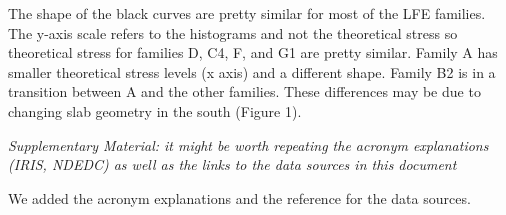 \documentclass[letterpaper, 12pt]{article}
\begin{document}
\bigskip


The shape of the black curves are pretty similar for most of the LFE families.  The y-axis scale refers to the histograms and not the theoretical stress so theoretical stress for families D, C4, F, and G1 are pretty similar.  Family A has smaller theoretical stress levels (x axis) and a different shape.  Family B2 is in a transition between A and the other families. These differences may be due to changing slab geometry in the south (Figure 1).

\bigskip

\textit{Supplementary Material: it might be worth repeating the acronym explanations (IRIS, NDEDC) as well as the links to the data sources in this document}

\bigskip

We added the acronym explanations and the reference for the data sources.
\end{document}
